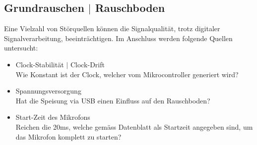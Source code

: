 \documentclass[12pt]{article}
\begin{document}
	\newpage
	\subsection*{Grundrauschen $\vert$ Rauschboden} \label{Grundrauschen}
	Eine Vielzahl von Störquellen können die Signalqualität, trotz digitaler Signalverarbeitung, beeinträchtigen. Im Anschluss werden folgende Quellen untersucht:
	\begin{itemize}
		\item Clock-Stabilität $\vert$ Clock-Drift \\
		Wie Konstant ist der Clock, welcher vom Mikrocontroller generiert wird?
		\item Spannungsversorgung \\
		Hat die Speisung via USB einen Einfluss auf den Rauschboden?
		\item Start-Zeit des Mikrofons \\
		Reichen die 20ms, welche gemäss Datenblatt als Startzeit angegeben sind, um das Mikrofon komplett zu starten?
	\end{itemize}
\end{document}
